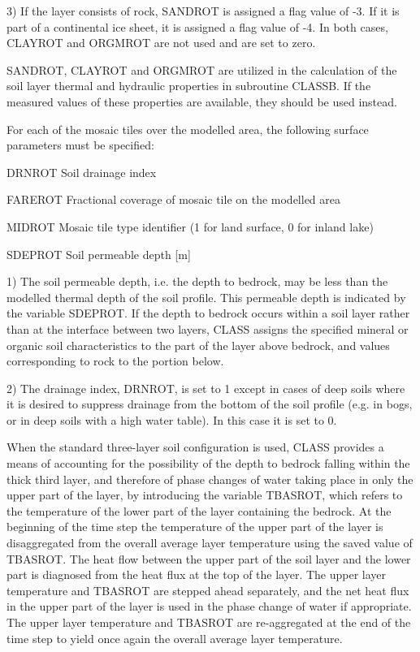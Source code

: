 3) If the layer consists of rock, S\+A\+N\+D\+R\+O\+T is assigned a flag value of -\/3. If it is part of a continental ice sheet, it is assigned a flag value of -\/4. In both cases, C\+L\+A\+Y\+R\+O\+T and O\+R\+G\+M\+R\+O\+T are not used and are set to zero.

S\+A\+N\+D\+R\+O\+T, C\+L\+A\+Y\+R\+O\+T and O\+R\+G\+M\+R\+O\+T are utilized in the calculation of the soil layer thermal and hydraulic properties in subroutine C\+L\+A\+S\+S\+B. If the measured values of these properties are available, they should be used instead.

For each of the mosaic tiles over the modelled area, the following surface parameters must be specified\+:


\begin{DoxyItemize}
\item D\+R\+N\+R\+O\+T Soil drainage index
\item F\+A\+R\+E\+R\+O\+T Fractional coverage of mosaic tile on the modelled area
\item M\+I\+D\+R\+O\+T Mosaic tile type identifier (1 for land surface, 0 for inland lake)
\item S\+D\+E\+P\+R\+O\+T Soil permeable depth \mbox{[}m\mbox{]}
\end{DoxyItemize}

1) The soil permeable depth, i.\+e. the depth to bedrock, may be less than the modelled thermal depth of the soil profile. This permeable depth is indicated by the variable S\+D\+E\+P\+R\+O\+T. If the depth to bedrock occurs within a soil layer rather than at the interface between two layers, C\+L\+A\+S\+S assigns the specified mineral or organic soil characteristics to the part of the layer above bedrock, and values corresponding to rock to the portion below.

2) The drainage index, D\+R\+N\+R\+O\+T, is set to 1 except in cases of deep soils where it is desired to suppress drainage from the bottom of the soil profile (e.\+g. in bogs, or in deep soils with a high water table). In this case it is set to 0.

When the standard three-\/layer soil configuration is used, C\+L\+A\+S\+S provides a means of accounting for the possibility of the depth to bedrock falling within the thick third layer, and therefore of phase changes of water taking place in only the upper part of the layer, by introducing the variable T\+B\+A\+S\+R\+O\+T, which refers to the temperature of the lower part of the layer containing the bedrock. At the beginning of the time step the temperature of the upper part of the layer is disaggregated from the overall average layer temperature using the saved value of T\+B\+A\+S\+R\+O\+T. The heat flow between the upper part of the soil layer and the lower part is diagnosed from the heat flux at the top of the layer. The upper layer temperature and T\+B\+A\+S\+R\+O\+T are stepped ahead separately, and the net heat flux in the upper part of the layer is used in the phase change of water if appropriate. The upper layer temperature and T\+B\+A\+S\+R\+O\+T are re-\/aggregated at the end of the time step to yield once again the overall average layer temperature.

